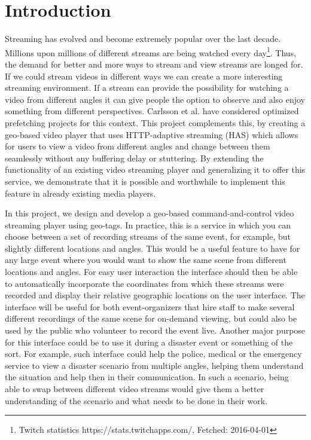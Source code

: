 \chapter{Introduction}
\label{cha:introduction}

Streaming has evolved and become extremely popular over the last decade. Millions upon millions of different streams are being watched every day\footnote{Twitch statistics https://stats.twitchapps.com/, Fetched: 2016-04-01}. Thus, the demand for better and more ways to stream and view streams are longed for. If we could stream videos in different ways we can create a more interesting streaming environment. If a stream can provide the possibility for watching a video from different angles it can give people the option to observe and also enjoy something from different perspectives. Carlsson et al.\cite{optimizedstreaming} have considered optimized prefetching projects for this context. This project complements this, by creating a geo-based video player that uses HTTP-adaptive streaming (HAS) which allows for users to view a video from different angles and change between them seamlessly without any buffering delay or stuttering. By extending the functionality of an existing video streaming player and generalizing it to offer this service, we demonstrate that it is possible and worthwhile to implement this feature in already existing media players.

In this project, we design and develop a geo-based command-and-control video streaming player using geo-tags. In practice, this is a service in which you can choose between a set of recording streams of the same event, for example, but slightly different locations and angles. This would be a useful feature to have for any large event where you would want to show the same scene from different locations and angles. For easy user interaction the interface should then be able to automatically incorporate the coordinates from which these streams were recorded and display their relative geographic locations on the user interface. The interface will be useful for both event-organizers that hire staff to make several different recordings of the same scene for on-demand viewing, but could also be used by the public who volunteer to record the event live. Another major purpose for this interface could be to use it during a disaster event or something of the sort. For example, such interface could help the police, medical or the emergency service to view a disaster scenario from multiple angles, helping them understand the situation and help then in their communication. In such a scenario, being able to swap between different video streams would give them a better understanding of the scenario and what needs to be done in their work.

